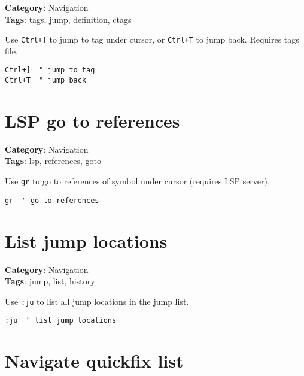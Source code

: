 {{{{{{{{{\textbf{Category}: Navigation\\ \textbf{Tags}: tags, jump, definition, ctags
\vspace{0.5cm}

Use {\footnotesize \Verb§Ctrl+]§} to jump to tag under cursor, or {\footnotesize \Verb§Ctrl+T§} to jump back. Requires tags file.

\begin{Exa*}{}
\begin{Verbatim}[fontsize=\footnotesize, breaklines, breakanywhere]
Ctrl+]  " jump to tag
Ctrl+T  " jump back
\end{Verbatim}
\end{Exa*}

\section{LSP go to references}

\textbf{Category}: Navigation\\ \textbf{Tags}: lsp, references, goto
\vspace{0.5cm}

Use {\footnotesize \Verb§gr§} to go to references of symbol under cursor (requires LSP server).

\begin{Exa*}{}
\begin{Verbatim}[fontsize=\footnotesize, breaklines, breakanywhere]
gr  " go to references
\end{Verbatim}
\end{Exa*}

\section{List jump locations}

\textbf{Category}: Navigation\\ \textbf{Tags}: jump, list, history
\vspace{0.5cm}

Use {\footnotesize \Verb§:ju§} to list all jump locations in the jump list.

\begin{Exa*}{}
\begin{Verbatim}[fontsize=\footnotesize, breaklines, breakanywhere]
:ju  " list jump locations
\end{Verbatim}
\end{Exa*}

\section{Navigate quickfix list}

}}}}}}}}}
